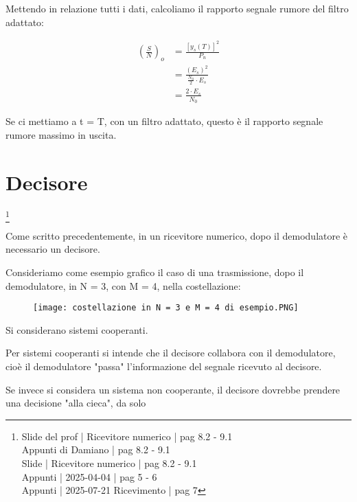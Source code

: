 Mettendo in relazione tutti i dati, calcoliamo il rapporto segnale rumore del filtro adattato: 

{
    \Large 
    \begin{equation}
        \begin{split}
            \left(
                \frac{S}{N}
            \right)_{o}
            &= 
            \frac{\left[y_s (T)\right]^{2}}{P_n}
            \\
            &= 
            \frac{(E_s)^{2}}{\frac{N_0}{2} \cdot E_s}
            \\
            &= 
            \frac{2 \cdot E_s}{N_0}
        \end{split}
    \end{equation}
}

Se ci mettiamo a t = T, 
con un filtro adattato, questo è il rapporto segnale rumore massimo in uscita. \newline 

\newpage 

\section{Decisore}
\footnote{Slide del prof | Ricevitore numerico | pag 8.2 - 9.1\\  
Appunti di Damiano | pag 8.2 - 9.1\\
Slide | Ricevitore numerico | pag 8.2 - 9.1 \\
Appunti | 2025-04-04 | pag 5 - 6 \\
Appunti | 2025-07-21 Ricevimento | pag 7
}

Come scritto precedentemente, 
in un ricevitore numerico, 
dopo il demodulatore è necessario un decisore. \newline 

Consideriamo come esempio grafico il caso di una trasmissione, dopo il demodulatore, 
in N = 3, con M = 4, nella costellazione: 

\begin{figure}[h]
    \centering
    \texttt{[image: costellazione in N = 3 e M = 4 di esempio.PNG]}
\end{figure}

Si considerano sistemi cooperanti. \newline 

\begin{tcolorbox}
Per sistemi cooperanti si intende che il decisore collabora con il demodulatore, 
cioè il demodulatore "passa" l'informazione del segnale ricevuto al decisore. \newline 

Se invece si considera un sistema non cooperante, il decisore dovrebbe prendere una decisione "alla cieca", 
da solo
\end{tcolorbox}

